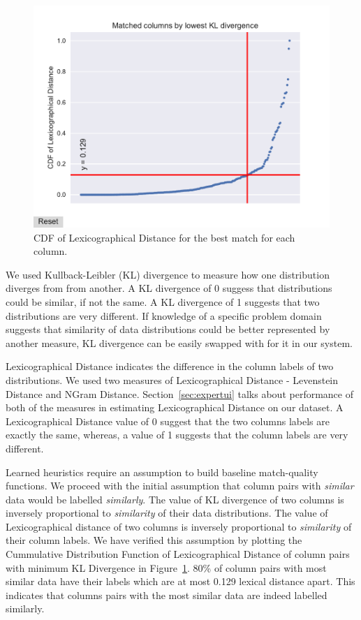 \begin{figure}
	\centering
	\includegraphics[trim={0 6mm 0 0},clip,width=1\columnwidth]{graphics/CDF_LexDistance}
	\caption{CDF of Lexicographical Distance for the best match for each column.}
	\label{fig:cdflexdist}
	\trimfigurespacing
\end{figure}

We used Kullback-Leibler (KL) divergence to measure how one distribution diverges from from another. A KL divergence of 0 suggess that distributions could be similar, if not the same. A KL divergence of 1 suggests that two distributions are very different. If knowledge of a specific problem domain suggests that similarity of data distributions could be better represented by another measure, KL divergence can be easily swapped with for it in our system.  

Lexicographical Distance indicates the difference in the column labels of two distributions. We used two measures of Lexicographical Distance - Levenstein Distance and NGram Distance. Section~\ref{sec:expertui} talks about performance of both of the measures in estimating Lexicographical Distance on our dataset. A Lexicographical Distance value of 0 suggest that the two columns labels are exactly the same, whereas, a value of 1 suggests that the column labels are very different.

Learned heuristics require an assumption to build baseline match-quality functions. We proceed with the initial assumption that column pairs with \textit{similar} data would be labelled \textit{similarly}. The value of KL divergence of two columns is inversely proportional to \textit{similarity} of their data distributions. The value of Lexicographical distance of two columns is inversely proportional to \textit{similarity} of their column labels. We have verified this assumption by plotting the Cummulative Distribution Function of Lexicographical Distance of column pairs with minimum KL Divergence in Figure~\ref{fig:cdflexdist}. 80\% of column pairs with most similar data have their labels which are at most 0.129 lexical distance apart. This indicates that columns pairs with the most similar data are indeed labelled similarly. 
 
